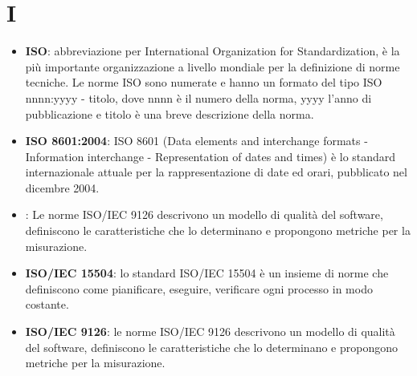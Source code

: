 \section{I}
\begin{itemize} 
	\item
	\textbf{ISO}: abbreviazione per International Organization for Standardization, è la più importante organizzazione a livello mondiale per la definizione di norme tecniche. Le norme ISO sono numerate e hanno un formato del tipo ISO nnnn:yyyy - titolo, dove nnnn è il numero della norma, yyyy l'anno di pubblicazione e titolo è una breve descrizione della norma.
	\item
	\textbf{ISO 8601:2004}: ISO 8601 (Data elements and interchange formats - Information interchange - Representation of dates and times) è lo standard internazionale attuale per la rappresentazione di date ed orari, pubblicato nel dicembre 2004.
	\item \textbf{}: Le norme ISO/IEC 9126 descrivono un modello di qualità del software, definiscono le caratteristiche che lo determinano e propongono metriche per la misurazione.
	\item \textbf{ISO/IEC 15504}: lo standard ISO/IEC 15504 è un insieme di norme che definiscono come pianificare, eseguire, verificare ogni processo in modo costante.
	\item \textbf{ISO/IEC 9126}: le norme ISO/IEC 9126 descrivono un modello di qualità del software, definiscono le caratteristiche che lo determinano e propongono metriche per la misurazione.
\end{itemize}